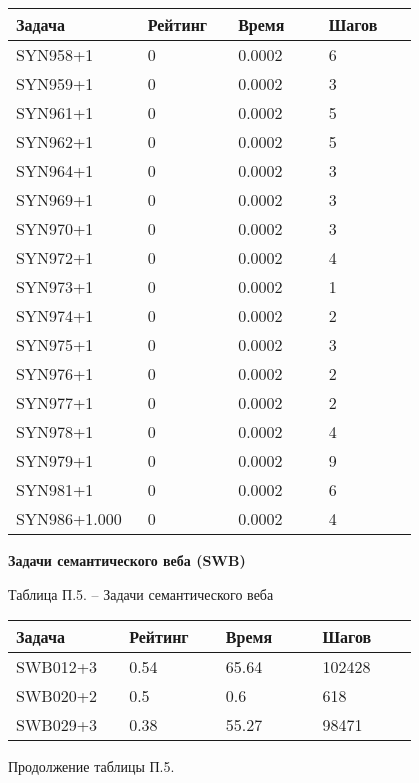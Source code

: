 \begin{longtable}[H]{|p{0.2\linewidth}|p{0.2\linewidth}|p{0.2\linewidth}|p{0.2\linewidth}|}
\hline
\textbf{Задача} & \textbf{Рейтинг} & \textbf{Время} & \textbf{Шагов} \\
\hline
SYN958+1 &  0 &  0.0002 &  6 \\
\hline
SYN959+1 &  0 &  0.0002 &  3 \\
\hline
SYN961+1 &  0 &  0.0002 &  5 \\
\hline
SYN962+1 &  0 &  0.0002 &  5 \\
\hline
SYN964+1 &  0 &  0.0002 &  3 \\
\hline
SYN969+1 &  0 &  0.0002 &  3 \\
\hline
SYN970+1 &  0 &  0.0002 &  3 \\
\hline
SYN972+1 &  0 &  0.0002 &  4 \\
\hline
SYN973+1 &  0 &  0.0002 &  1 \\
\hline
SYN974+1 &  0 &  0.0002 &  2 \\
\hline
SYN975+1 &  0 &  0.0002 &  3 \\
\hline
SYN976+1 &  0 &  0.0002 &  2 \\
\hline
SYN977+1 &  0 &  0.0002 &  2 \\
\hline
SYN978+1 &  0 &  0.0002 &  4 \\
\hline
SYN979+1 &  0 &  0.0002 &  9 \\
\hline
SYN981+1 &  0 &  0.0002 &  6 \\
\hline
SYN986+1.000 &  0 &  0.0002 &  4 \\
\hline
\end{longtable}


\textbf{Задачи семантического веба (SWB)}

\begin{center}
Таблица П.5. -- Задачи семантического веба
\end{center}

\begin{longtable}[H]{|p{0.2\linewidth}|p{0.2\linewidth}|p{0.2\linewidth}|p{0.2\linewidth}|}
\hline
\textbf{Задача} & \textbf{Рейтинг} & \textbf{Время} & \textbf{Шагов} \\
\hline
SWB012+3 &  0.54 &  65.64 &  102428 \\
\hline
SWB020+2 &  0.5 &  0.6 &  618 \\
\hline
SWB029+3 &  0.38 &  55.27 &  98471 \\
\hline
\end{longtable}
\begin{center}
Продолжение таблицы П.5.
\end{center}

